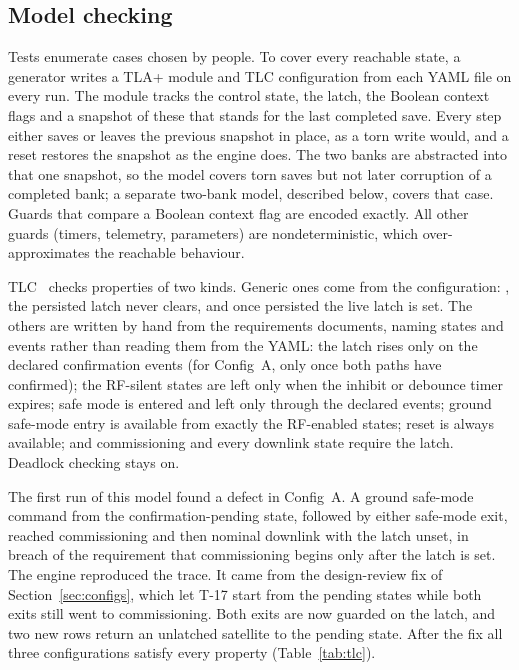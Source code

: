 \documentclass[preprint,12pt]{elsarticle}
\newcommand{\cfgA}{Config~A}
\begin{document}
\subsection{Model checking}\label{sec:mc}

Tests enumerate cases chosen by people. To cover every reachable state, a generator writes a TLA+ module and TLC configuration from each YAML file on every run. The module tracks the control state, the latch, the Boolean context flags and a snapshot of these that stands for the last completed save. Every step either saves or leaves the previous snapshot in place, as a torn write would, and a reset restores the snapshot as the engine does. The two banks are abstracted into that one snapshot, so the model covers torn saves but not later corruption of a completed bank; a separate two-bank model, described below, covers that case. Guards that compare a Boolean context flag are encoded exactly. All other guards (timers, telemetry, parameters) are nondeterministic, which over-approximates the reachable behaviour.

TLC~\cite{Yu1999TLC} checks properties of two kinds. Generic ones come from the configuration: , the persisted latch never clears, and once persisted the live latch is set. The others are written by hand from the requirements documents, naming states and events rather than reading them from the YAML: the latch rises only on the declared confirmation events (for \cfgA{}, only once both paths have confirmed); the RF-silent states are left only when the inhibit or debounce timer expires; safe mode is entered and left only through the declared events; ground safe-mode entry is available from exactly the RF-enabled states; reset is always available; and commissioning and every downlink state require the latch. Deadlock checking stays on.

The first run of this model found a defect in \cfgA{}. A ground safe-mode command from the confirmation-pending state, followed by either safe-mode exit, reached commissioning and then nominal downlink with the latch unset, in breach of the requirement that commissioning begins only after the latch is set. The engine reproduced the trace. It came from the design-review fix of Section~\ref{sec:configs}, which let T-17 start from the pending states while both exits still went to commissioning. Both exits are now guarded on the latch, and two new rows return an unlatched satellite to the pending state. After the fix all three configurations satisfy every property (Table~\ref{tab:tlc}).
\end{document}
